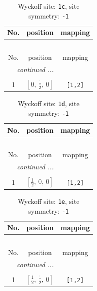 \documentclass[fleqn,8pt]{jsarticle}
\begin{document}
\begin{longtable}{ccc}
\caption{Wyckoff site: {\tt 1c}, site symmetry: {\tt -1}}
 \\
 \hline \hline
No. & position & mapping \\ \hline \endfirsthead

\multicolumn{2}{l}{\tablename\ \thetable{}} \\
 \hline \hline
No. & position & mapping \\ \hline \endhead

 \hline \hline
\multicolumn{2}{r}{\footnotesize\it continued ...} \\ \endfoot

 \hline \hline
\multicolumn{2}{r}{} \\ \endlastfoot

1 & $\left[ 0,\, \frac{1}{2},\, 0 \right]$ & {\tt [1,2]} \\
\end{longtable}
\renewcommand{\arraystretch}{1.2}
\begin{longtable}{ccc}
\caption{Wyckoff site: {\tt 1d}, site symmetry: {\tt -1}}
 \\
 \hline \hline
No. & position & mapping \\ \hline \endfirsthead

\multicolumn{2}{l}{\tablename\ \thetable{}} \\
 \hline \hline
No. & position & mapping \\ \hline \endhead

 \hline \hline
\multicolumn{2}{r}{\footnotesize\it continued ...} \\ \endfoot

 \hline \hline
\multicolumn{2}{r}{} \\ \endlastfoot

1 & $\left[ \frac{1}{2},\, 0,\, 0 \right]$ & {\tt [1,2]} \\
\end{longtable}
\renewcommand{\arraystretch}{1.2}
\begin{longtable}{ccc}
\caption{Wyckoff site: {\tt 1e}, site symmetry: {\tt -1}}
 \\
 \hline \hline
No. & position & mapping \\ \hline \endfirsthead

\multicolumn{2}{l}{\tablename\ \thetable{}} \\
 \hline \hline
No. & position & mapping \\ \hline \endhead

 \hline \hline
\multicolumn{2}{r}{\footnotesize\it continued ...} \\ \endfoot

 \hline \hline
\multicolumn{2}{r}{} \\ \endlastfoot

1 & $\left[ \frac{1}{2},\, \frac{1}{2},\, 0 \right]$ & {\tt [1,2]} \\
\end{longtable}
\end{document}
